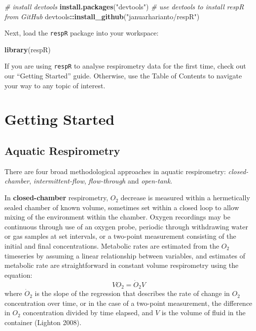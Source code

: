 \documentclass[]{book}
\newenvironment{Shaded}{\begin{snugshade}}{\end{snugshade}}
\newcommand{\KeywordTok}[1]{\textcolor[rgb]{0.13,0.29,0.53}{\textbf{#1}}}
\newcommand{\StringTok}[1]{\textcolor[rgb]{0.31,0.60,0.02}{#1}}
\newcommand{\CommentTok}[1]{\textcolor[rgb]{0.56,0.35,0.01}{\textit{#1}}}
\newcommand{\OperatorTok}[1]{\textcolor[rgb]{0.81,0.36,0.00}{\textbf{#1}}}
\newcommand{\NormalTok}[1]{#1}
\begin{document}
\begin{Shaded}
\begin{Highlighting}[]
\CommentTok{# install devtools}
\KeywordTok{install.packages}\NormalTok{(}\StringTok{"devtools"}\NormalTok{)}
\CommentTok{# use devtools to install respR from GitHub}
\NormalTok{devtools}\OperatorTok{::}\KeywordTok{install_github}\NormalTok{(}\StringTok{"januarharianto/respR"}\NormalTok{)}
\end{Highlighting}
\end{Shaded}

Next, load the \texttt{respR} package into your workspace:

\begin{Shaded}
\begin{Highlighting}[]
\KeywordTok{library}\NormalTok{(respR)}
\end{Highlighting}
\end{Shaded}

If you are using \texttt{respR} to analyse respirometry data for the
first time, check out our ``Getting Started'' guide. Otherwise, use the
Table of Contents to navigate your way to any topic of interest.

\chapter{Getting Started}\label{getting-started}

\section{Aquatic Respirometry}\label{aquatic-respirometry}

There are four broad methodological approaches in aquatic respirometry:
\emph{closed-chamber}, \emph{intermittent-flow}, \emph{flow-through} and
\emph{open-tank}.

In \textbf{closed-chamber} respirometry, \(O_2\) decrease is measured
within a hermetically sealed chamber of known volume, sometimes set
within a closed loop to allow mixing of the environment within the
chamber. Oxygen recordings may be continuous through use of an oxygen
probe, periodic through withdrawing water or gas samples at set
intervals, or a two-point measurement consisting of the initial and
final concentrations. Metabolic rates are estimated from the \(O_2\)
timeseries by assuming a linear relationship between variables, and
estimates of metabolic rate are straightforward in constant volume
respirometry using the equation: \[VO_2 = \dot O_2V\] where \(\dot O_2\)
is the slope of the regression that describes the rate of change in
\(O_2\) concentration over time, or in the case of a two-point
measurement, the difference in \(O_2\) concentration divided by time
elapsed, and \(V\) is the volume of fluid in the container (Lighton
2008).
\end{document}
